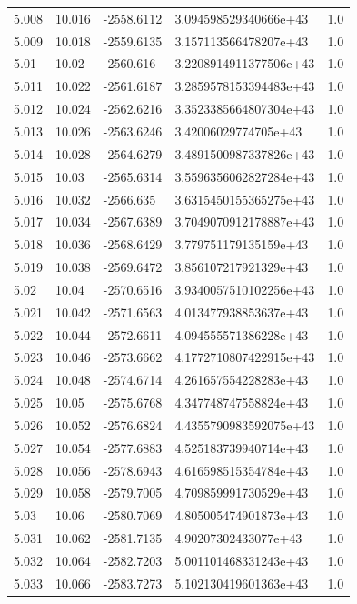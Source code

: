 \begin{tabular}{lllll}
5.008 & 10.016 & -2558.6112 & 3.094598529340666e+43 & 1.0 \\
5.009 & 10.018 & -2559.6135 & 3.157113566478207e+43 & 1.0 \\
5.01 & 10.02 & -2560.616 & 3.2208914911377506e+43 & 1.0 \\
5.011 & 10.022 & -2561.6187 & 3.2859578153394483e+43 & 1.0 \\
5.012 & 10.024 & -2562.6216 & 3.3523385664807304e+43 & 1.0 \\
5.013 & 10.026 & -2563.6246 & 3.42006029774705e+43 & 1.0 \\
5.014 & 10.028 & -2564.6279 & 3.4891500987337826e+43 & 1.0 \\
5.015 & 10.03 & -2565.6314 & 3.5596356062827284e+43 & 1.0 \\
5.016 & 10.032 & -2566.635 & 3.6315450155365275e+43 & 1.0 \\
5.017 & 10.034 & -2567.6389 & 3.7049070912178887e+43 & 1.0 \\
5.018 & 10.036 & -2568.6429 & 3.779751179135159e+43 & 1.0 \\
5.019 & 10.038 & -2569.6472 & 3.856107217921329e+43 & 1.0 \\
5.02 & 10.04 & -2570.6516 & 3.9340057510102256e+43 & 1.0 \\
5.021 & 10.042 & -2571.6563 & 4.013477938853637e+43 & 1.0 \\
5.022 & 10.044 & -2572.6611 & 4.094555571386228e+43 & 1.0 \\
5.023 & 10.046 & -2573.6662 & 4.1772710807422915e+43 & 1.0 \\
5.024 & 10.048 & -2574.6714 & 4.261657554228283e+43 & 1.0 \\
5.025 & 10.05 & -2575.6768 & 4.347748747558824e+43 & 1.0 \\
5.026 & 10.052 & -2576.6824 & 4.4355790983592075e+43 & 1.0 \\
5.027 & 10.054 & -2577.6883 & 4.525183739940714e+43 & 1.0 \\
5.028 & 10.056 & -2578.6943 & 4.616598515354784e+43 & 1.0 \\
5.029 & 10.058 & -2579.7005 & 4.709859991730529e+43 & 1.0 \\
5.03 & 10.06 & -2580.7069 & 4.805005474901873e+43 & 1.0 \\
5.031 & 10.062 & -2581.7135 & 4.90207302433077e+43 & 1.0 \\
5.032 & 10.064 & -2582.7203 & 5.001101468331243e+43 & 1.0 \\
5.033 & 10.066 & -2583.7273 & 5.102130419601363e+43 & 1.0 \\

\end{tabular}
